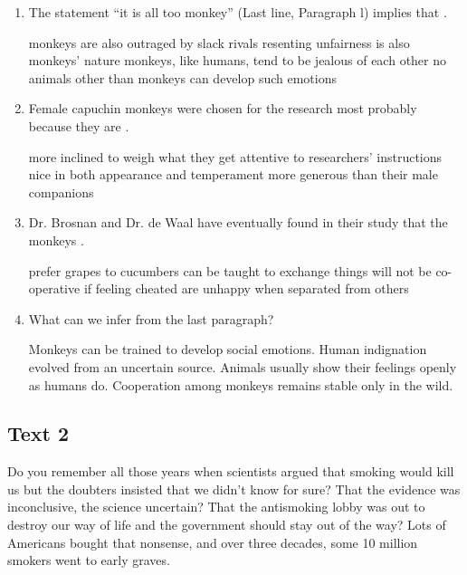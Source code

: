 {\begin{enumerate}[resume]
\fourchoices
{posing a contrast}
{justifying an assumption}
{making a comparison}
{explaining a phenomenon}


\item
The statement ``it is all too monkey'' (Last line, Paragraph
l) implies that \lineread.


\fourchoices
{monkeys are also outraged by slack rivals}
{resenting unfairness is also monkeys' nature}
{monkeys, like humans, tend to be jealous of each other}
{no animals other than monkeys can develop such emotions}


\item
Female capuchin monkeys were chosen for the research most
probably because they are \lineread.


\fourchoices
{more inclined to weigh what they get}
{attentive to researchers' instructions}
{nice in both appearance and temperament}
{more generous than their male companions}



\item
Dr. Brosnan and Dr. de Waal have eventually found in their
study that the monkeys \lineread.


\fourchoices
{prefer grapes to cucumbers}
{can be taught to exchange things}
{will not be co-operative if feeling cheated}
{are unhappy when separated from others}


\item
What can we infer from the last paragraph?


\fourchoices
{Monkeys can be trained to develop social emotions.}
{Human indignation evolved from an uncertain source.}
{Animals usually show their feelings openly as humans do.}
{Cooperation among monkeys remains stable only in the wild.}

	
\end{enumerate}


\newpage
\subsection{Text 2}


Do you remember all those years when scientists argued that smoking
would kill us but the doubters insisted that we didn't know for sure?
That the evidence was inconclusive, the science uncertain? That the
antismoking lobby was out to destroy our way of life and the government
should stay out of the way? Lots of Americans bought that nonsense, and
over three decades, some 10 million smokers went to early graves.

}

